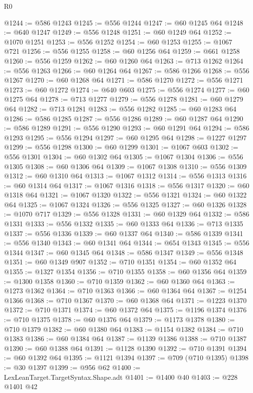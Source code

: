 \begin{lexlean}{R0}
\begin{coremodule}
@1244 := @586 @1243
@1245 := @556 @1244
@1247 := @60 @1245 @64
@1248 := @640 @1247
@1249 := @556 @1248
@1251 := @60 @1249 @64
@1252 := @1070 @1251
@1253 := @556 @1252
@1254 := @60 @1253
@1255 := @1067 @721
@1256 := @556 @1255
@1258 := @60 @1256 @64
@1259 := @661 @1258
@1260 := @556 @1259
@1262 := @60 @1260 @64
@1263 := @713 @1262
@1264 := @556 @1263
@1266 := @60 @1264 @64
@1267 := @586 @1266
@1268 := @556 @1267
@1270 := @60 @1268 @64
@1271 := @586 @1270
@1272 := @556 @1271
@1273 := @60 @1272
@1274 := @640 @603
@1275 := @556 @1274
@1277 := @60 @1275 @64
@1278 := @713 @1277
@1279 := @556 @1278
@1281 := @60 @1279 @64
@1282 := @713 @1281
@1283 := @556 @1282
@1285 := @60 @1283 @64
@1286 := @586 @1285
@1287 := @556 @1286
@1289 := @60 @1287 @64
@1290 := @586 @1289
@1291 := @556 @1290
@1293 := @60 @1291 @64
@1294 := @586 @1293
@1295 := @556 @1294
@1297 := @60 @1295 @64
@1298 := @1227 @1297
@1299 := @556 @1298
@1300 := @60 @1299
@1301 := @1067 @603
@1302 := @556 @1301
@1304 := @60 @1302 @64
@1305 := @1067 @1304
@1306 := @556 @1305
@1308 := @60 @1306 @64
@1309 := @1067 @1308
@1310 := @556 @1309
@1312 := @60 @1310 @64
@1313 := @1067 @1312
@1314 := @556 @1313
@1316 := @60 @1314 @64
@1317 := @1067 @1316
@1318 := @556 @1317
@1320 := @60 @1318 @64
@1321 := @1067 @1320
@1322 := @556 @1321
@1324 := @60 @1322 @64
@1325 := @1067 @1324
@1326 := @556 @1325
@1327 := @60 @1326
@1328 := @1070 @717
@1329 := @556 @1328
@1331 := @60 @1329 @64
@1332 := @586 @1331
@1333 := @556 @1332
@1335 := @60 @1333 @64
@1336 := @713 @1335
@1337 := @556 @1336
@1339 := @60 @1337 @64
@1340 := @586 @1339
@1341 := @556 @1340
@1343 := @60 @1341 @64
@1344 := @654 @1343
@1345 := @556 @1344
@1347 := @60 @1345 @64
@1348 := @586 @1347
@1349 := @556 @1348
@1351 := @60 @1349 @907
@1352 := @710 @1351
@1354 := @60 @1352 @64
@1355 := @1327 @1354
@1356 := @710 @1355
@1358 := @60 @1356 @64
@1359 := @1300 @1358
@1360 := @710 @1359
@1362 := @60 @1360 @64
@1363 := @1273 @1362
@1364 := @710 @1363
@1366 := @60 @1364 @64
@1367 := @1254 @1366
@1368 := @710 @1367
@1370 := @60 @1368 @64
@1371 := @1223 @1370
@1372 := @710 @1371
@1374 := @60 @1372 @64
@1375 := @1196 @1374
@1376 := @710 @1375
@1378 := @60 @1376 @64
@1379 := @1173 @1378
@1380 := @710 @1379
@1382 := @60 @1380 @64
@1383 := @1154 @1382
@1384 := @710 @1383
@1386 := @60 @1384 @64
@1387 := @1139 @1386
@1388 := @710 @1387
@1390 := @60 @1388 @64
@1391 := @1128 @1390
@1392 := @710 @1391
@1394 := @60 @1392 @64
@1395 := @1121 @1394
@1397 := @709 (@710 @1395)
@1398 := @30 @1397
@1399 := @956 @62
@1400 := LexLeanTarget.TargetSyntax.Shape.adt
@1401 := @1400 @40
@1403 := @228 @1401 @42

\end{coremodule}
\end{lexlean}
